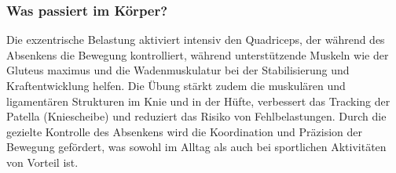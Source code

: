
\subsubsection{Was passiert im Körper?}
Die exzentrische Belastung aktiviert intensiv den Quadriceps, der während des Absenkens die Bewegung kontrolliert, während unterstützende Muskeln wie der Gluteus maximus und die Wadenmuskulatur bei der Stabilisierung und Kraftentwicklung helfen.
Die Übung stärkt zudem die muskulären und ligamentären Strukturen im Knie und in der Hüfte, verbessert das Tracking der Patella (Kniescheibe) und reduziert das Risiko von Fehlbelastungen.
Durch die gezielte Kontrolle des Absenkens wird die Koordination und Präzision der Bewegung gefördert, was sowohl im Alltag als auch bei sportlichen Aktivitäten von Vorteil ist.



